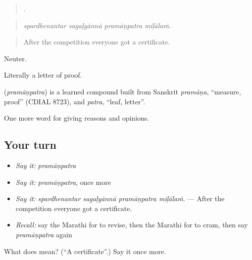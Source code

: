 \begin{quote}
   .
\end{quote}

\begin{quote}
\emph{spardhenantar sagaḷyānnā pramāṇpatra miḷālaṁ.}
\end{quote}

\begin{quote}
After the competition everyone got a certificate.
\end{quote}

Neuter.

Literally a letter of proof.

\begin{cousinweb}
\textbf{} (\emph{pramāṇpatra}) is a learned compound built from Sanskrit \emph{pramāṇa}, \textquotedblleft{}measure, proof\textquotedblright{} (CDIAL 8723), and \emph{patra}, \textquotedblleft{}leaf, letter\textquotedblright{}.
\end{cousinweb}

\begin{grammarlens}[title={What you've built}]
One more word for giving reasons and opinions.
\end{grammarlens}

\subsection*{Your turn}
\begin{itemize}
\raggedright
  \item \emph{Say it:} \emph{pramāṇpatra}
  \item \emph{Say it:} \emph{pramāṇpatra}, once more
  \item \emph{Say it:} \emph{spardhenantar sagaḷyānnā pramāṇpatra miḷālaṁ.} — After the competition everyone got a certificate.
  \item \emph{Recall:} say the Marathi for to revise, then the Marathi for to cram, then say \emph{pramāṇpatra} again
\end{itemize}

\begin{tcolorbox}[breakable,colback=teal!4,colframe=teal!35!black,title={Before you move on}]
What does  mean? (\textquotedblleft{}A certificate\textquotedblright{}.) Say it once more.
\end{tcolorbox}
